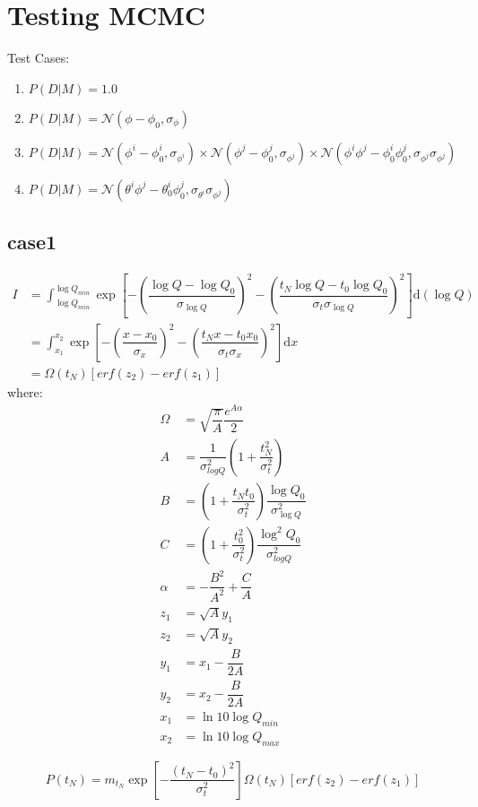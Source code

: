 \documentclass[10pt]{article}
\begin{document}
\section{Testing MCMC}

Test Cases:
\begin{enumerate}
\item $P(D|M) = 1.0$
\item $P(D|M) = \mathcal{N}(\phi-\phi_0,\sigma_{\phi})$
\item $P(D|M) = \mathcal{N}(\phi^i-\phi^i_0,\sigma_{\phi^i}) \times \mathcal{N}(\phi^j-\phi^j_0,\sigma_{\phi^j}) \times \mathcal{N}(\phi^i\phi^j-\phi^i_0\phi^j_0,\sigma_{\phi^j}\sigma_{\phi^j})$
\item $P(D|M) = \mathcal{N}(\theta^i\phi^j-\theta^i_0\phi^j_0,\sigma_{\theta^i}\sigma_{\phi^j})$
\end{enumerate}
\subsection{case1}


\newpage

\begin{align*}
I &= \int_{\log{Q_{min}}}^{\log{Q_{min}}} \exp\left[ - \left(\dfrac{\log{Q} - \log{Q_0}}{\sigma_{\log{Q}}}\right)^2 - \left( \dfrac{t_N\log{Q} - t_0\log{Q_0}}{\sigma_t\sigma_{\log{Q}}} \right)^2\right] \mathrm{d}(\log{Q}) \\
&= \int_{x_1}^{x_2} \exp\left[ - \left(\dfrac{x - x_0}{\sigma_x}\right)^2 - \left( \dfrac{t_Nx - t_0x_0}{\sigma_t\sigma_x} \right)^2\right] \mathrm{d}x \\  
&= \Omega(t_N) \left[ erf(z_2)- erf(z_1)\right]
\end{align*}
where:
\begin{align*}
\Omega &= \sqrt{\dfrac{\pi}{A}}\dfrac{e^{A\alpha}}{2} \\
A &= \dfrac{1}{\sigma^2_{logQ}}\left( 1 + \dfrac{t^2_N}{\sigma^2_t}\right) \\
B &= \left(1 + \dfrac{t_Nt_0}{\sigma^2_t}\right)\dfrac{\log{Q_0}}{\sigma^2_{\log{Q}}}  \\
C &= \left(1 + \dfrac{t^2_0}{\sigma^2_t}\right)\dfrac{\log^2{Q_0}}{\sigma^2_{logQ}} \\
\alpha &= -\dfrac{B^2}{A^2} + \dfrac{C}{A} \\
z_1 &= \sqrt{A}y_1 \\
z_2 &= \sqrt{A}y_2 \\
y_1 &= x_1-\dfrac{B}{2A} \\
y_2 &= x_2-\dfrac{B}{2A} \\
x_1 &= \ln{10}\log{Q_{min}} \\
x_2 &= \ln{10}\log{Q_{max}} 
\end{align*}


\begin{large}
\[
\boxed{ P(t_N) = m_{t_N} \exp\left[-\dfrac{(t_N-t_0)^2}{\sigma^2_t}\right]\Omega(t_N) \left[ erf(z_2) - erf(z_1) \right] }
\]
\end{large}



\newpage
\end{document}
